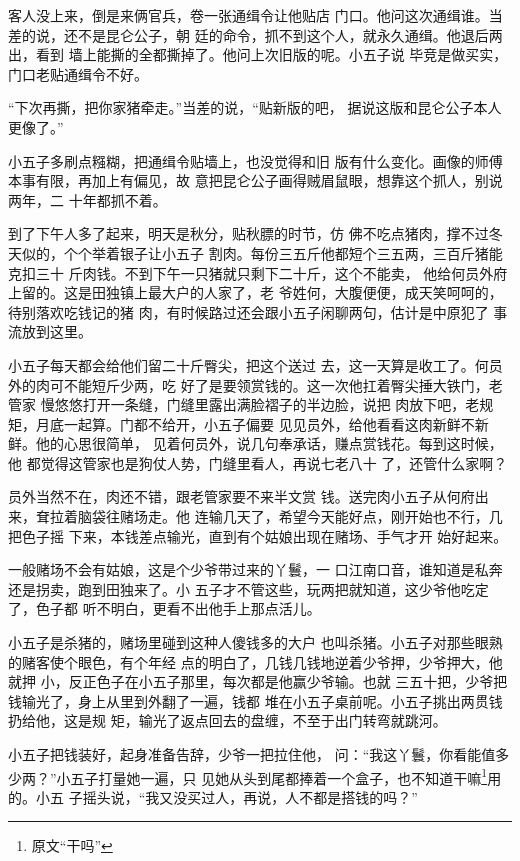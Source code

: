 客人没上来，倒是来俩官兵，卷一张通缉令让他贴店
门口。他问这次通缉谁。当差的说，还不是昆仑公子，朝
廷的命令，抓不到这个人，就永久通缉。他退后两出，看到
墙上能撕的全都撕掉了。他问上次旧版的呢。小五子说
毕竞是做买实，门口老贴通缉令不好。

“下次再撕，把你家猪牵走。”当差的说，“贴新版的吧，
据说这版和昆仑公子本人更像了。”

小五子多刷点糨糊，把通缉令贴墙上，也没觉得和旧
版有什么变化。画像的师傅本事有限，再加上有偏见，故
意把昆仑公子画得贼眉鼠眼，想靠这个抓人，别说两年，二
十年都抓不着。

到了下午人多了起来，明天是秋分，贴秋膘的时节，仿
佛不吃点猪肉，撑不过冬天似的，个个举着银子让小五子
割肉。每份三五斤他都短个三五两，三百斤猪能克扣三十
斤肉钱。不到下午一只猪就只剩下二十斤，这个不能卖，
他给何员外府上留的。这是田独镇上最大户的人家了，老
爷姓何，大腹便便，成天笑呵呵的，待别落欢吃钱记的猪
肉，有时候路过还会跟小五子闲聊两句，估计是中原犯了
事流放到这里。

小五子每天都会给他们留二十斤臀尖，把这个送过
去，这一天算是收工了。何员外的肉可不能短斤少两，吃
好了是要领赏钱的。这一次他扛着臀尖捶大铁门，老管家
慢悠悠打开一条缝，门缝里露出满脸褶子的半边脸，说把
肉放下吧，老规矩，月底一起算。门都不给开，小五子偏要
见见员外，给他看看这肉新鲜不新鲜。他的心思很简单，
见着何员外，说几句奉承话，赚点赏钱花。每到这时候，他
都觉得这管家也是狗仗人势，门缝里看人，再说七老八十
了，还管什么家啊？

员外当然不在，肉还不错，跟老管家要不来半文赏
钱。送完肉小五子从何府出来，耷拉着脑袋往赌场走。他
连输几天了，希望今天能好点，刚开始也不行，几把色子摇
下来，本钱差点输光，直到有个姑娘出现在赌场、手气才开
始好起来。

一般赌场不会有姑娘，这是个少爷带过来的丫鬟，一
口江南口音，谁知道是私奔还是拐卖，跑到田独来了。小
五子才不管这些，玩两把就知道，这少爷他吃定了，色子都
听不明白，更看不出他手上那点活儿。

小五子是杀猪的，赌场里碰到这种人傻钱多的大户
也叫杀猪。小五子对那些眼熟的赌客使个眼色，有个年经
点的明白了，几钱几钱地逆着少爷押，少爷押大，他就押
小，反正色子在小五子那里，每次都是他赢少爷输。也就
三五十把，少爷把钱输光了，身上从里到外翻了一遍，钱都
堆在小五子桌前呢。小五子挑出两贯钱扔给他，这是规
矩，输光了返点回去的盘缠，不至于出门转弯就跳河。

小五子把钱装好，起身准备告辞，少爷一把拉住他，
问：“我这丫鬟，你看能值多少两？”小五子打量她一遍，只
见她从头到尾都捧着一个盒子，也不知道干嘛\footnote{原文“干吗”}用的。小五
子摇头说，“我又没买过人，再说，人不都是搭钱的吗？”

